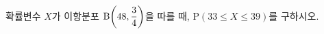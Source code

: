 확률변수 $X$가 이항분포 $\mathrm{B}\!\left(48{,}\mkern3mu\mathopen{}\dfrac{3}{4}\right)$을 따를 때, $\mathrm{P}(33\le X\le 39)$를 구하시오. 
